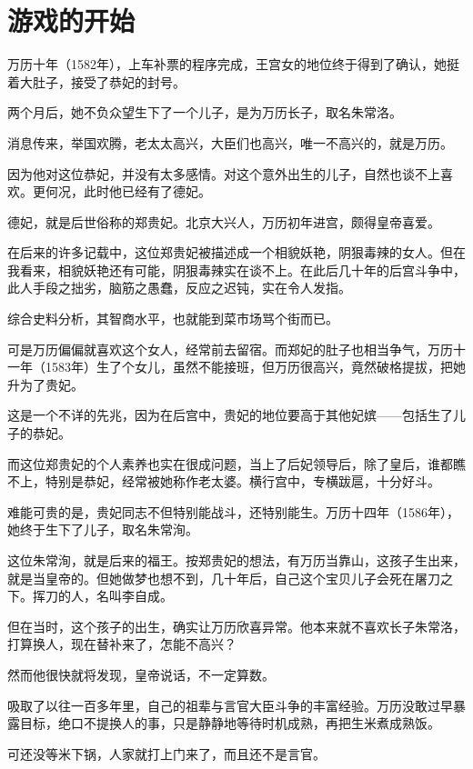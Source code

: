 \section{游戏的开始}
\ifnum{}
	\begin{multicols}{\theparacolNo}
		\fi
		万历十年（1582年），上车补票的程序完成，王宫女的地位终于得到了确认，她挺着大肚子，接受了恭妃的封号。

		两个月后，她不负众望生下了一个儿子，是为万历长子，取名朱常洛。

		消息传来，举国欢腾，老太太高兴，大臣们也高兴，唯一不高兴的，就是万历。

		因为他对这位恭妃，并没有太多感情。对这个意外出生的儿子，自然也谈不上喜欢。更何况，此时他已经有了德妃。

		德妃，就是后世俗称的郑贵妃。北京大兴人，万历初年进宫，颇得皇帝喜爱。

		在后来的许多记载中，这位郑贵妃被描述成一个相貌妖艳，阴狠毒辣的女人。但在我看来，相貌妖艳还有可能，阴狠毒辣实在谈不上。在此后几十年的后宫斗争中，此人手段之拙劣，脑筋之愚蠢，反应之迟钝，实在令人发指。

		综合史料分析，其智商水平，也就能到菜市场骂个街而已。

		可是万历偏偏就喜欢这个女人，经常前去留宿。而郑妃的肚子也相当争气，万历十一年（1583年）生了个女儿，虽然不能接班，但万历很高兴，竟然破格提拔，把她升为了贵妃。

		这是一个不详的先兆，因为在后宫中，贵妃的地位要高于其他妃嫔——包括生了儿子的恭妃。

		而这位郑贵妃的个人素养也实在很成问题，当上了后妃领导后，除了皇后，谁都瞧不上，特别是恭妃，经常被她称作老太婆。横行宫中，专横跋扈，十分好斗。

		难能可贵的是，贵妃同志不但特别能战斗，还特别能生。万历十四年（1586年），她终于生下了儿子，取名朱常洵。

		这位朱常洵，就是后来的福王。按郑贵妃的想法，有万历当靠山，这孩子生出来，就是当皇帝的。但她做梦也想不到，几十年后，自己这个宝贝儿子会死在屠刀之下。挥刀的人，名叫李自成。

		但在当时，这个孩子的出生，确实让万历欣喜异常。他本来就不喜欢长子朱常洛，打算换人，现在替补来了，怎能不高兴？

		然而他很快就将发现，皇帝说话，不一定算数。

		吸取了以往一百多年里，自己的祖辈与言官大臣斗争的丰富经验。万历没敢过早暴露目标，绝口不提换人的事，只是静静地等待时机成熟，再把生米煮成熟饭。

		可还没等米下锅，人家就打上门来了，而且还不是言官。


\end{multicols}
